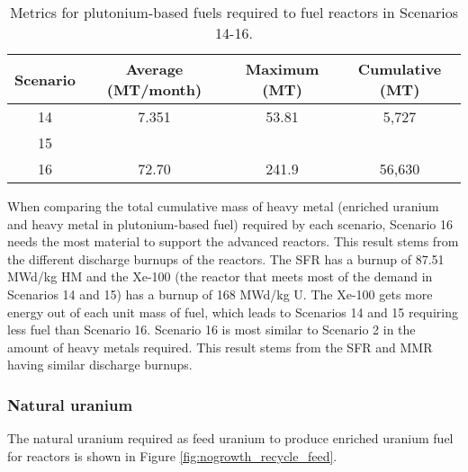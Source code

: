 \begin{table}[h!]
    \centering 
    \caption{Metrics for plutonium-based fuels required to fuel reactors 
    in Scenarios 14-16.}
    \label{tab:s14-16_mox}
    \begin{tabular}{c c c c}
        \hline 
        Scenario & Average (MT/month) & Maximum (MT) & Cumulative (MT) \\
        \hline 
        14 & 7.351 & 53.81 & 5,727 \\
        15 & & &  \\
        16 & 72.70 & 241.9 & 56,630 \\
        \hline
        
    \end{tabular}
\end{table}

When comparing the total cumulative mass of heavy metal (enriched 
uranium and heavy metal in plutonium-based fuel) required by each scenario,
Scenario 16 needs the most material to support the advanced reactors. This 
result stems from the different discharge burnups of the reactors. The 
\gls{SFR} has a burnup of 87.51 MWd/kg HM and the Xe-100 (the reactor that 
meets most of the demand in Scenarios 14 and 15) has a burnup of 168 MWd/kg U. 
The Xe-100 gets more energy out of each unit mass of fuel, which leads to 
Scenarios 14 and 15 requiring less fuel than Scenario 16. Scenario 16 is most 
similar to Scenario 2 in the amount of heavy metals required. This result 
stems from the \gls{SFR} and \gls{MMR} having similar discharge burnups.

\subsubsection{Natural uranium}
The natural uranium required as feed uranium to produce enriched 
uranium fuel for reactors is shown in Figure \ref{fig:nogrowth_recycle_feed}.



